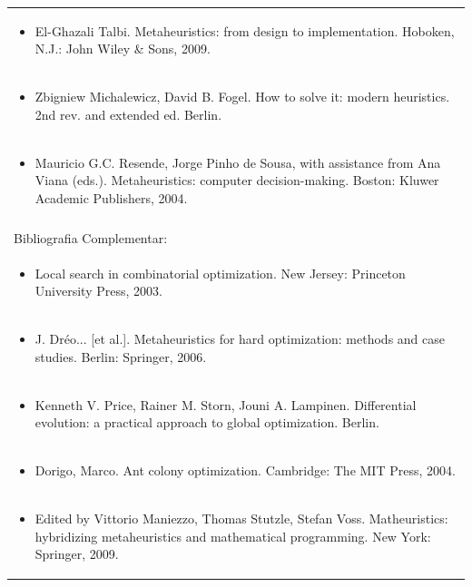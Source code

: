 \documentclass[11pt]{article}
\begin{document}
\begin{center}
\begin{longtable}{|p{4cm}|p{4cm}|p{4cm}|p{4cm}|}
\multicolumn{4}{|p{\dimexpr 16cm + 6\tabcolsep\relax}|}{\begin{itemize}\item El-Ghazali Talbi. Metaheuristics: from design to implementation. Hoboken, N.J.: John Wiley \& Sons, 2009.\end{itemize}}\\
\multicolumn{4}{|p{\dimexpr 16cm + 6\tabcolsep\relax}|}{\begin{itemize}\item Zbigniew Michalewicz, David B. Fogel. How to solve it: modern heuristics. 2nd rev. and extended ed. Berlin.\end{itemize}}\\
\multicolumn{4}{|p{\dimexpr 16cm + 6\tabcolsep\relax}|}{\begin{itemize}\item Mauricio G.C. Resende, Jorge Pinho de Sousa, with assistance from Ana Viana (eds.). Metaheuristics: computer decision-making. Boston: Kluwer Academic Publishers, 2004.\end{itemize}}\\
\multicolumn{4}{|p{16cm}|}{}\\
\hline
\multicolumn{4}{|p{16cm}|}{Bibliografia Complementar:}\\*
\multicolumn{4}{|p{\dimexpr 16cm + 6\tabcolsep\relax}|}{\begin{itemize}\item Local search in combinatorial optimization. New Jersey: Princeton University Press, 2003.\end{itemize}}\\
\multicolumn{4}{|p{\dimexpr 16cm + 6\tabcolsep\relax}|}{\begin{itemize}\item J. Dréo... [et al.]. Metaheuristics for hard optimization: methods and case studies. Berlin: Springer, 2006.\end{itemize}}\\
\multicolumn{4}{|p{\dimexpr 16cm + 6\tabcolsep\relax}|}{\begin{itemize}\item Kenneth V. Price, Rainer M. Storn, Jouni A. Lampinen. Differential evolution: a practical approach to global optimization. Berlin.\end{itemize}}\\
\multicolumn{4}{|p{\dimexpr 16cm + 6\tabcolsep\relax}|}{\begin{itemize}\item Dorigo, Marco. Ant colony optimization. Cambridge: The MIT Press, 2004.\end{itemize}}\\
\multicolumn{4}{|p{\dimexpr 16cm + 6\tabcolsep\relax}|}{\begin{itemize}\item Edited by Vittorio Maniezzo, Thomas Stutzle, Stefan Voss. Matheuristics: hybridizing metaheuristics and mathematical programming. New York: Springer, 2009.\end{itemize}}\\
\hline
\end{longtable}
\end{center}
\end{document}
